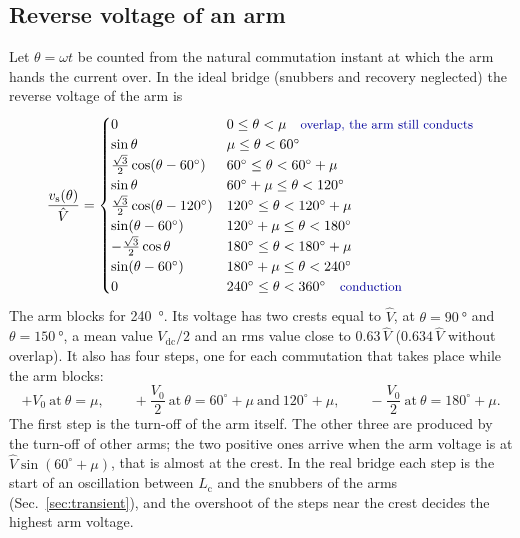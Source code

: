 \documentclass[10pt,a4paper]{scrartcl}
\newcommand{\Lc}{L_\mathrm{c}}
\newcommand{\Vdc}{V_\mathrm{dc}}
\newcommand{\Vo}{V_0}
\newcommand{\Vh}{\hat V}
\newcommand{\rt}[1]{\text{\small\color{blue!60!black} #1}}
\begin{document}
\subsection{Reverse voltage of an arm}
\label{sec:armvoltage}
Let $\theta = \omega t$ be counted from the natural commutation instant at which the arm hands the current over. In the ideal bridge (snubbers and recovery neglected) the reverse voltage of the arm is
\begin{equation}
\frac{v_\mathrm{s}(\theta)}{\Vh} =
\begin{cases}
0 & 0 \le \theta < \mu \quad \rt{overlap, the arm still conducts}\\
\sin\theta & \mu \le \theta < 60^\circ\\
\tfrac{\sqrt3}{2}\cos(\theta - 60^\circ) & 60^\circ \le \theta < 60^\circ + \mu\\
\sin\theta & 60^\circ + \mu \le \theta < 120^\circ\\
\tfrac{\sqrt3}{2}\cos(\theta - 120^\circ) & 120^\circ \le \theta < 120^\circ + \mu\\
\sin(\theta - 60^\circ) & 120^\circ + \mu \le \theta < 180^\circ\\
-\tfrac{\sqrt3}{2}\cos\theta & 180^\circ \le \theta < 180^\circ + \mu\\
\sin(\theta - 60^\circ) & 180^\circ + \mu \le \theta < 240^\circ\\
0 & 240^\circ \le \theta < 360^\circ \quad \rt{conduction}
\end{cases}
\label{eq:varm}
\end{equation}
The arm blocks for \SI{240}{\degree}. Its voltage has two crests equal to $\Vh$, at $\theta = \SI{90}{\degree}$ and $\theta = \SI{150}{\degree}$, a mean value $\Vdc/2$ and an rms value close to $0.63\,\Vh$ ($0.634\,\Vh$ without overlap). It also has four steps, one for each commutation that takes place while the arm blocks:
\begin{equation}
+\Vo \ \text{at}\ \theta = \mu, \qquad +\frac{\Vo}{2} \ \text{at}\ \theta = 60^\circ + \mu \ \text{and}\ 120^\circ + \mu, \qquad -\frac{\Vo}{2} \ \text{at}\ \theta = 180^\circ + \mu .
\label{eq:steps}
\end{equation}
The first step is the turn-off of the arm itself. The other three are produced by the turn-off of other arms; the two positive ones arrive when the arm voltage is at $\Vh\sin(60^\circ + \mu)$, that is almost at the crest. In the real bridge each step is the start of an oscillation between $\Lc$ and the snubbers of the arms (Sec.~\ref{sec:transient}), and the overshoot of the steps near the crest decides the highest arm voltage.
\end{document}
